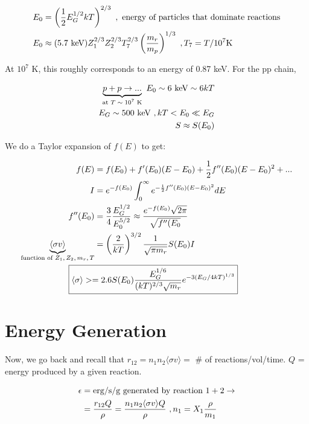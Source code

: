 \begin{align}
E_{0} &= \left( \frac{1}{2} E_{G}^{1/2}kT\right)^{2/3}~,\textrm{ energy of particles that dominate reactions}\\
E_{0} &\approx (5.7 \textrm{ keV} )Z_{1}^{2/3}Z_{2}^{2/3}T_{7}^{2/3} \left( \frac{m_{r}}{m_{p}} \right)^{1/3}~,T_{7} = T/10^{7}\textrm{K}
\end{align}

At $10^{7}$ K, this roughly corresponds to an energy of 0.87 keV. For the pp chain,

\begin{align}
\underbrace{p + p \rightarrow ...}_{\textrm{at $T \sim 10^{7}$ K}} ~E_{0} \sim 6 \textrm{ keV} \sim 6kT\\
E_{G} \sim 500 \textrm{ keV}~,kT < E_{0} \ll E_{G}\\
S \approx S(E_{0})
\end{align}

We do a Taylor expansion of $f(E)$ to get:

\begin{align}
f(E) &= f(E_{0}) + f' (E_{0})(E - E_{0}) + \half f'' (E_{0})(E-E_{0})^{2}+...\\
I &= e^{-f(E_{0})} \int_{0}^{\infty}e^{-\frac{1}{2} f''(E_{0})(E-E_{0})^{2}}dE\\
f''(E_{0}) &= \frac{3}{4}\frac{E_{G}^{1/2}}{E_{0}^{5/2}} \approx \frac{e^{-f(E_{0})} \sqrt{2\pi}	}{\sqrt{f''(E_{0}}}\\
\underbrace{\langle \sigma v\rangle}_{\textrm{function of $Z_{1},Z_{2},m_{r},T$}} &= \lp \frac{2}{kT}\rp^{3/2}\frac{1}{\sqrt{\pi m_{r}}} S(E_{0})I\\
\Aboxed{\langle \sigma \rangle > &= 2.6 S(E_{0}) \frac{E_{G}^{1/6}}{(kT)^{2/3}\sqrt{m_{r}}} e^{-3(E_{G}/4kT)^{1/3}}}
\end{align}

\section{Energy Generation}

Now, we go back and recall that $r_{12} = n_{1}n_{2}\langle \sigma v\rangle  = $ \# of reactions/vol/time. $Q$ = energy produced by a given reaction.

\begin{align}
\epsilon &= \textrm{erg/s/g generated by reaction } 1 + 2 \rightarrow\\
&= \frac{r_{12}Q}{\rho} = \frac{n_{1}n_{2}\langle \sigma v\rangle Q}{\rho}~,n_{1}=X_{1} \frac{\rho}{m_{1}}
\end{align}

